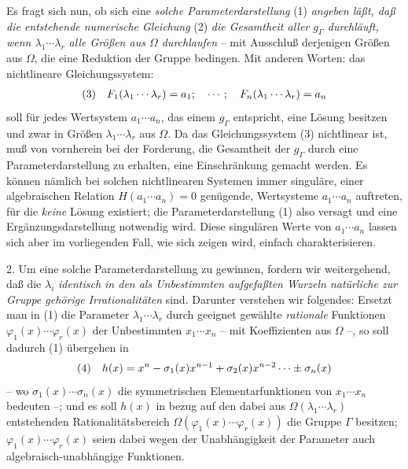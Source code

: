 Es fragt sich nun, ob sich eine \emph{solche Parameterdarstellung} (1) \emph{angeben läßt, daß die entstehende numerische Gleichung} (2) \emph{die Gesamtheit aller $g_\Gamma$ durchläuft, wenn $\lambda_1\cdots\lambda_r$ alle Größen aus $\Omega$ durchlaufen} -- mit Ausschluß derjenigen Größen aus $\Omega$, die eine Reduktion der Gruppe bedingen. Mit anderen Worten: das nichtlineare Gleichungssystem:
\[
\begin{array}{@{}l@{\quad}l@{}}
(3)& \displaystyle F_1(\lambda_1\cdots\lambda_r)=a_1;\quad \cdots;\quad F_n(\lambda_1\cdots\lambda_r)=a_n
\end{array}
\]
soll für jedes Wertsystem $a_1\cdots a_n$, das einem $g_\Gamma$ entspricht, eine Lösung besitzen und zwar in Größen $\lambda_1\cdots\lambda_r$ aus $\Omega$. Da das Gleichungssystem (3) nichtlinear ist, muß von vornherein bei der Forderung, die Gesamtheit der $g_\Gamma$ durch eine Parameterdarstellung zu erhalten, eine Einschränkung gemacht werden. Es können nämlich bei solchen nichtlinearen Systemen immer singuläre, einer algebraischen Relation $H(a_1\cdots a_n)=0$ genügende, Wertsysteme $a_1\cdots a_n$ auftreten, für die \emph{keine} Lösung existiert; die Parameterdarstellung (1) also versagt und eine Ergänzungsdarstellung notwendig wird. Diese singulären Werte von $a_1\cdots a_n$ lassen sich aber im vorliegenden Fall, wie sich zeigen wird, einfach charakterisieren.

2. Um eine solche Parameterdarstellung zu gewinnen, fordern wir weitergehend, daß die $\lambda_i$ \emph{identisch in den als Unbestimmten aufgefaßten Wurzeln natürliche zur Gruppe gehörige Irrationalitäten} sind. Darunter verstehen wir folgendes: Ersetzt man in (1) die Parameter $\lambda_1\cdots\lambda_r$ durch geeignet gewählte \emph{rationale} Funktionen $\varphi_1(x)\cdots\varphi_r(x)$ der Unbestimmten $x_1\cdots x_n$ -- mit Koeffizienten aus $\Omega$ --, so soll dadurch (1) übergehen in
\[
\begin{array}{@{}l@{\quad}l@{}}
(4)& \displaystyle h(x)=x^n-\sigma_1(x)x^{n-1}+\sigma_2(x)x^{n-2}\cdots\pm\sigma_n(x)
\end{array}
\]
-- wo $\sigma_1(x)\cdots\sigma_n(x)$ die symmetrischen Elementarfunktionen von $x_1\cdots x_n$ bedeuten --; und es soll $h(x)$ in bezug auf den dabei aus $\Omega(\lambda_1\cdots\lambda_r)$ entstehenden Rationalitätsbereich $\Omega(\varphi_1(x)\cdots\varphi_r(x))$ die Gruppe $\Gamma$ besitzen; $\varphi_1(x)\cdots\varphi_r(x)$ seien dabei wegen der Unabhängigkeit der Parameter auch algebraisch-unabhängige Funktionen.

